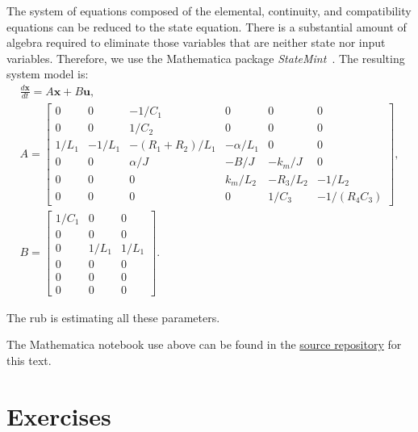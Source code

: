 \documentclass[dynamic_systems.tex]{subfiles}
\begin{document}
The system of equations composed of the elemental, continuity, and compatibility equations can be reduced to the state equation. 
There is a substantial amount of algebra required to eliminate those variables that are neither state nor input variables.
Therefore, we use the Mathematica package \emph{StateMint}~\citep{Picone2018}.
The resulting system model is:
\tags{}
\begin{gather*}
\frac{d \bm{x}}{d t} = A \bm{x} + B \bm{u}, \\
A = 
\begin{bmatrix}
0 & 0 & -1/C_1 & 0 & 0 & 0 \\
0 & 0 & 1/C_2 & 0 & 0 & 0 \\
1/L_1 & -1/L_1 & -(R_1+R_2)/L_1 & -\alpha/L_1 & 0 & 0 \\
0 & 0 & \alpha/J & -B/J & -k_m/J & 0 \\
0 & 0 & 0 & k_m/L_2 & -R_3/L_2 & -1/L_2 \\
0 & 0 & 0 & 0 & 1/C_3 & -1/(R_4 C_3)
\end{bmatrix},
\\
B = 
\begin{bmatrix}
1/C_1 & 0 & 0 \\
0 & 0 & 0 \\
0 & 1/L_1 & 1/L_1 \\
0 & 0 & 0 \\
0 & 0 & 0 \\
0 & 0 & 0
\end{bmatrix}.
\end{gather*}

The rub is estimating all these parameters.
\tags{}

The Mathematica notebook use above can be found in the \href{http://ricopic.one/dynamic_systems/source/}{source repository} for this text.
\tags{}

\section*{Exercises}









\end{document}
